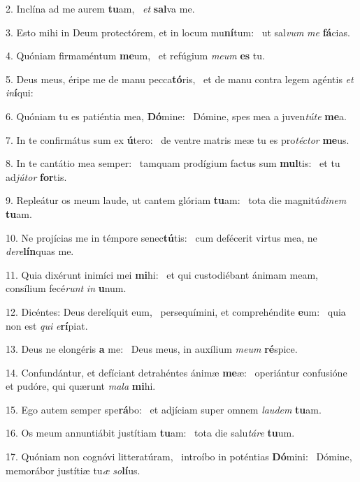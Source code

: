 2. Inclína ad me aurem \textbf{tu}am, \ast\  \textit{et} \textbf{sal}va me.\

3. Esto mihi in Deum protectórem, et in locum mu\textbf{ní}tum: \ast\  ut sal\textit{vum} \textit{me} \textbf{fá}cias.\

4. Quóniam firmaméntum \textbf{me}um, \ast\  et refúgium \textit{me}\textit{um} \textbf{es} tu.\

5. Deus meus, éripe me de manu pecca\textbf{tó}ris, \ast\  et de manu contra legem agéntis \textit{et} \textit{in}\textbf{í}qui:\

6. Quóniam tu es patiéntia mea, \textbf{Dó}mine: \ast\  Dómine, spes mea a juven\textit{tú}\textit{te} \textbf{me}a.\

7. In te confirmátus sum ex \textbf{ú}tero: \ast\  de ventre matris meæ tu es pro\textit{téc}\textit{tor} \textbf{me}us.\

8. In te cantátio mea semper: \dag\  tamquam prodígium factus sum \textbf{mul}tis: \ast\  et tu ad\textit{jú}\textit{tor} \textbf{for}tis.\

9. Repleátur os meum laude, ut cantem glóriam \textbf{tu}am: \ast\  tota die magnitú\textit{di}\textit{nem} \textbf{tu}am.\

10. Ne projícias me in témpore senec\textbf{tú}tis: \ast\  cum defécerit virtus mea, ne \textit{de}\textit{re}\textbf{lín}quas me.\

11. Quia dixérunt inimíci mei \textbf{mi}hi: \ast\  et qui custodiébant ánimam meam, consílium fecé\textit{runt} \textit{in} \textbf{u}num.\

12. Dicéntes: Deus derelíquit eum, \dag\  persequímini, et comprehéndite \textbf{e}um: \ast\  quia non est \textit{qui} \textit{e}\textbf{rí}piat.\

13. Deus ne elongéris \textbf{a} me: \ast\  Deus meus, in auxílium \textit{me}\textit{um} \textbf{ré}spice.\

14. Confundántur, et defíciant detrahéntes ánimæ \textbf{me}æ: \ast\  operiántur confusióne et pudóre, qui quærunt \textit{ma}\textit{la} \textbf{mi}hi.\

15. Ego autem semper spe\textbf{rá}bo: \ast\  et adjíciam super omnem \textit{lau}\textit{dem} \textbf{tu}am.\

16. Os meum annuntiábit justítiam \textbf{tu}am: \ast\  tota die salu\textit{tá}\textit{re} \textbf{tu}um.\

17. Quóniam non cognóvi litteratúram, \dag\  introíbo in poténtias \textbf{Dó}mini: \ast\  Dómine, memorábor justítiæ tu\textit{æ} \textit{so}\textbf{lí}us.\

